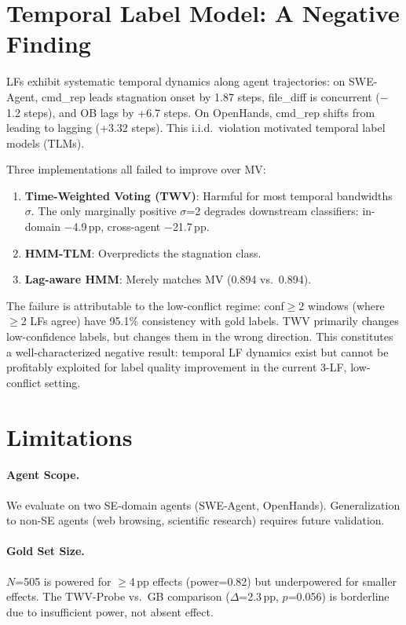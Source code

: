 \documentclass[11pt,a4paper]{article}
\begin{document}
\section{Temporal Label Model: A Negative Finding}
\label{sec:tlm}

LFs exhibit systematic temporal dynamics along agent trajectories: on SWE-Agent, cmd\_rep leads stagnation onset by 1.87 steps, file\_diff is concurrent ($-$1.2 steps), and OB lags by +6.7 steps.
On OpenHands, cmd\_rep shifts from leading to lagging (+3.32 steps).
This i.i.d.\ violation motivated temporal label models (TLMs).

Three implementations all failed to improve over MV:
\begin{enumerate}
\item \textbf{Time-Weighted Voting (TWV)}: Harmful for most temporal bandwidths $\sigma$. The only marginally positive $\sigma$=2 degrades downstream classifiers: in-domain $-$4.9\,pp, cross-agent $-$21.7\,pp.
\item \textbf{HMM-TLM}: Overpredicts the stagnation class.
\item \textbf{Lag-aware HMM}: Merely matches MV (0.894 vs.\ 0.894).
\end{enumerate}

The failure is attributable to the low-conflict regime: conf$\geq$2 windows (where $\geq$2 LFs agree) have 95.1\% consistency with gold labels.
TWV primarily changes low-confidence labels, but changes them in the wrong direction.
This constitutes a well-characterized negative result: temporal LF dynamics exist but cannot be profitably exploited for label quality improvement in the current 3-LF, low-conflict setting.

\section{Limitations}
\label{sec:limitations}

\paragraph{Agent Scope.}
We evaluate on two SE-domain agents (SWE-Agent, OpenHands). Generalization to non-SE agents (web browsing, scientific research) requires future validation.

\paragraph{Gold Set Size.}
$N$=505 is powered for $\geq$4\,pp effects (power=0.82) but underpowered for smaller effects. The TWV-Probe vs.\ GB comparison ($\Delta$=2.3\,pp, $p$=0.056) is borderline due to insufficient power, not absent effect.
\end{document}
